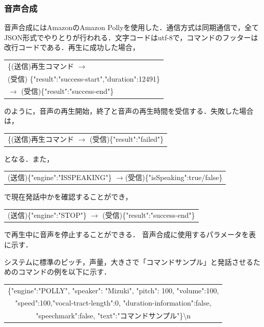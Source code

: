 \subsubsection{音声合成}
音声合成にはAmazonのAmazon Pollyを使用した．通信方式は同期通信で，全てJSON形式でやりとりが行われる．文字コードはutf-8で，コマンドのフッターは改行コードである．再生に成功した場合，
\begin{table}[hbtp]
    \centering
    \begin{tabular}{l}
    \{(送信)再生コマンド $\rightarrow$\\ 
    (受信) \{"result":"success-start","duration":12491\} \\
    $\rightarrow$ (受信)\{"result":"success-end"\}\\
    \end{tabular}
\end{table}    
のように，音声の再生開始，終了と音声の再生時間を受信する．失敗した場合は，
\begin{table}[hbtp]
    \centering
    \begin{tabular}{l}
    \{(送信)再生コマンド $\rightarrow$ (受信)\{"result":"failed"\}
    \end{tabular}
\end{table}
となる．また，

\begin{table}[hbtp]
    \centering
    \begin{tabular}{l}
        (送信)\{"engine":"ISSPEAKING"\} $\rightarrow$(受信)\{"isSpeaking":true/false\}
    \end{tabular}
\end{table}

で現在発話中かを確認することができ，

\begin{table}[hbtp]
    \centering
    \begin{tabular}{l}
        (送信)\{"engine":"STOP"\} $\rightarrow$ (受信)\{"result":"success-end"\}
    \end{tabular}
\end{table}

で再生中に音声を停止することができる．
音声合成に使用するパラメータを表に示す．


システムに標準のピッチ，声量，大きさで「コマンドサンプル」と発話させるためのコマンドの例を以下に示す．
\begin{table}[hbtp]
    \centering
    \begin{tabular}{c}
        \{"engine":"POLLY", "speaker": "Mizuki",  "pitch": 100, "volume":100, \\
        "speed":100,"vocal-tract-length":0, "duration-information":false,  \\
        "speechmark":false, "text":"コマンドサンプル"\}\textbackslash{}n
    \end{tabular}
\end{table}


